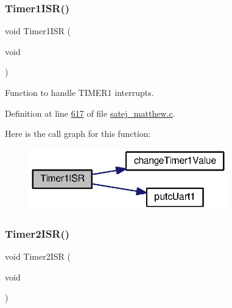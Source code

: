 \mbox{\label{tm4c123gh6pm__startup__ccs_8c_afdad67070c699e644b8ddae35b29347b}} 
\subsubsection{\texorpdfstring{Timer1ISR()}{Timer1ISR()}}
{\footnotesize\ttfamily void Timer1\+I\+SR (\begin{DoxyParamCaption}\item[{void}]{ }\end{DoxyParamCaption})}



Function to handle T\+I\+M\+E\+R1 interrupts. 



Definition at line \mbox{\hyperlink{satej__matthew_8c_source_l00617}{617}} of file \mbox{\hyperlink{satej__matthew_8c_source}{satej\+\_\+matthew.\+c}}.

Here is the call graph for this function\+:
\nopagebreak
\begin{figure}[H]
\begin{center}
\leavevmode
\includegraphics[width=244pt]{tm4c123gh6pm__startup__ccs_8c_afdad67070c699e644b8ddae35b29347b_cgraph}
\end{center}
\end{figure}
\mbox{\label{tm4c123gh6pm__startup__ccs_8c_a424b9010ddc61d3484dca1b6af5af5b0}} 
\subsubsection{\texorpdfstring{Timer2ISR()}{Timer2ISR()}}
{\footnotesize\ttfamily void Timer2\+I\+SR (\begin{DoxyParamCaption}\item[{void}]{ }\end{DoxyParamCaption})}



